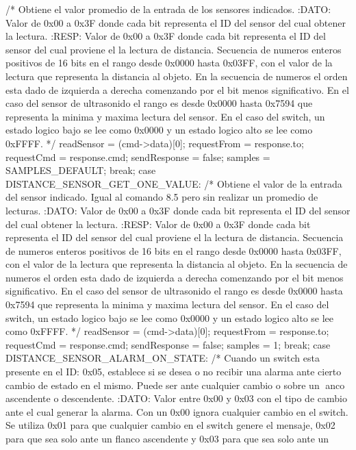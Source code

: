 {\begin{verbatimtab}
{{			/* Obtiene el valor promedio de la entrada de los sensores indicados.
			:DATO:
			Valor de 0x00 a 0x3F donde cada bit representa el ID del sensor
			del cual obtener la lectura.
			:RESP:
			Valor de 0x00 a 0x3F donde cada bit representa el ID del sensor
			del cual proviene el la lectura de distancia. Secuencia de numeros enteros
			positivos de 16 bits en el rango desde 0x0000 hasta 0x03FF, con el valor de
			la lectura que representa la distancia al objeto. En la secuencia de numeros
			el orden esta dado de izquierda a derecha comenzando por el bit menos
			significativo.
			En el caso del sensor de ultrasonido el rango es desde 0x0000 hasta 0x7594
			que representa la minima y maxima lectura del sensor.
			En el caso del switch, un estado logico bajo se lee como 0x0000 y un estado
			logico alto se lee como 0xFFFF.
			*/
			readSensor = (cmd->data)[0];
			requestFrom = 	response.to;
			requestCmd = response.cmd;
			sendResponse = false;
			samples = SAMPLES_DEFAULT;
		break;
 		case DISTANCE_SENSOR_GET_ONE_VALUE:
			/* Obtiene el valor de la entrada del sensor indicado. Igual al comando 8.5 pero
			sin realizar un promedio de lecturas.
			:DATO:
			Valor de 0x00 a 0x3F donde cada bit representa el ID del sensor
			del cual obtener la lectura.
			:RESP:
			Valor de 0x00 a 0x3F donde cada bit representa el ID del sensor
			del cual proviene el la lectura de distancia. Secuencia de numeros enteros
			positivos de 16 bits en el rango desde 0x0000 hasta 0x03FF, con el valor de
			la lectura que representa la distancia al objeto. En la secuencia de numeros
			el orden esta dado de izquierda a derecha comenzando por el bit menos
			significativo.
			En el caso del sensor de ultrasonido el rango es desde 0x0000 hasta 0x7594
			que representa la minima y maxima lectura del sensor.
			En el caso del switch, un estado logico bajo se lee como 0x0000 y un estado
			logico alto se lee como 0xFFFF.
			*/
			readSensor = (cmd->data)[0];
			requestFrom = 	response.to;
			requestCmd = response.cmd;
			sendResponse = false;
			samples = 1;
		break;
		case DISTANCE_SENSOR_ALARM_ON_STATE:
			/* Cuando un switch esta presente en el ID: 0x05, establece si se desea o no
			recibir una alarma ante cierto cambio de estado en el mismo. Puede ser ante
			cualquier cambio o sobre un anco ascendente o descendente.
			:DATO:
			Valor entre 0x00 y 0x03 con el tipo de cambio ante el cual generar
			la alarma. Con un 0x00 ignora cualquier cambio en el switch. Se utiliza
			0x01 para que cualquier cambio en el switch genere el mensaje, 0x02 para
			que sea solo ante un flanco ascendente y 0x03 para que sea solo ante un
}}
\end{verbatimtab}}

